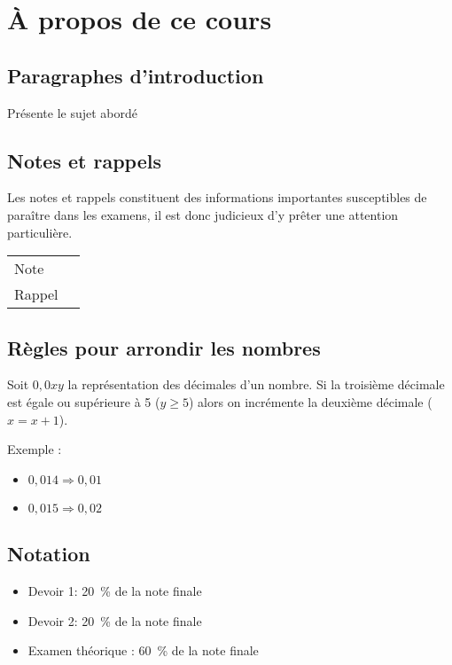 \chapter*{À propos de ce cours}



\section*{Paragraphes d'introduction}
\begin{intro}
	Présente le sujet abordé 
\end{intro}



\section*{Notes et rappels}
\begin{note}
	Les notes et rappels constituent des informations importantes susceptibles de paraître dans les examens, il est donc judicieux d'y prêter une attention particulière.
	\begin{center}
		\begin{tabular}{l@{\qquad}l}
			Note   & \Large\righthand \\
			Rappel & \Large\aldine
		\end{tabular}
	\end{center}
\end{note}



\section*{Règles pour arrondir les nombres}
Soit $0,0xy$ la représentation des décimales d'un nombre. Si la troisième décimale est égale ou supérieure à 5 ($y \geq 5$) alors on incrémente la deuxième décimale ($x = x + 1$).

Exemple :
\begin{itemize}
	\item $0,014 \Rightarrow 0,01$
	\item $0,015 \Rightarrow 0,02$
\end{itemize}



\section*{Notation}
\begin{itemize}
	\item Devoir 1: 20~\% de la note finale
	\item Devoir 2: 20~\% de la note finale
	\item Examen théorique : 60~\% de la note finale
\end{itemize}
